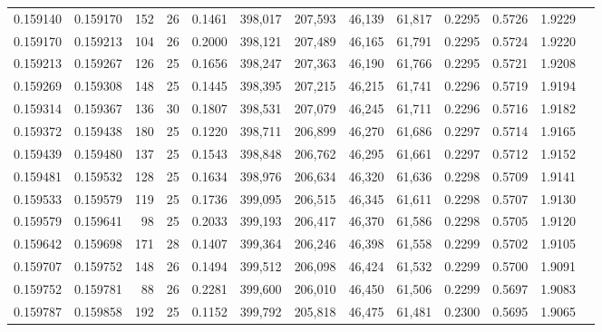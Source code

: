 \begin{tabular}{rrrrrrrrrrrrr}
0.159140 & 0.159170 & 152 &  26 &                                     0.1461 & 398,017 & 207,593 &  46,139 &  61,817 & 0.2295 & 0.5726 & 1.9229 \\
0.159170 & 0.159213 & 104 &  26 &                                     0.2000 & 398,121 & 207,489 &  46,165 &  61,791 & 0.2295 & 0.5724 & 1.9220 \\
0.159213 & 0.159267 & 126 &  25 &                                     0.1656 & 398,247 & 207,363 &  46,190 &  61,766 & 0.2295 & 0.5721 & 1.9208 \\
0.159269 & 0.159308 & 148 &  25 &                                     0.1445 & 398,395 & 207,215 &  46,215 &  61,741 & 0.2296 & 0.5719 & 1.9194 \\
0.159314 & 0.159367 & 136 &  30 &                                     0.1807 & 398,531 & 207,079 &  46,245 &  61,711 & 0.2296 & 0.5716 & 1.9182 \\
0.159372 & 0.159438 & 180 &  25 &                                     0.1220 & 398,711 & 206,899 &  46,270 &  61,686 & 0.2297 & 0.5714 & 1.9165 \\
0.159439 & 0.159480 & 137 &  25 &                                     0.1543 & 398,848 & 206,762 &  46,295 &  61,661 & 0.2297 & 0.5712 & 1.9152 \\
0.159481 & 0.159532 & 128 &  25 &                                     0.1634 & 398,976 & 206,634 &  46,320 &  61,636 & 0.2298 & 0.5709 & 1.9141 \\
0.159533 & 0.159579 & 119 &  25 &                                     0.1736 & 399,095 & 206,515 &  46,345 &  61,611 & 0.2298 & 0.5707 & 1.9130 \\
0.159579 & 0.159641 &  98 &  25 &                                     0.2033 & 399,193 & 206,417 &  46,370 &  61,586 & 0.2298 & 0.5705 & 1.9120 \\
0.159642 & 0.159698 & 171 &  28 &                                     0.1407 & 399,364 & 206,246 &  46,398 &  61,558 & 0.2299 & 0.5702 & 1.9105 \\
0.159707 & 0.159752 & 148 &  26 &                                     0.1494 & 399,512 & 206,098 &  46,424 &  61,532 & 0.2299 & 0.5700 & 1.9091 \\
0.159752 & 0.159781 &  88 &  26 &                                     0.2281 & 399,600 & 206,010 &  46,450 &  61,506 & 0.2299 & 0.5697 & 1.9083 \\
0.159787 & 0.159858 & 192 &  25 &                                     0.1152 & 399,792 & 205,818 &  46,475 &  61,481 & 0.2300 & 0.5695 & 1.9065 \\

\end{tabular}
